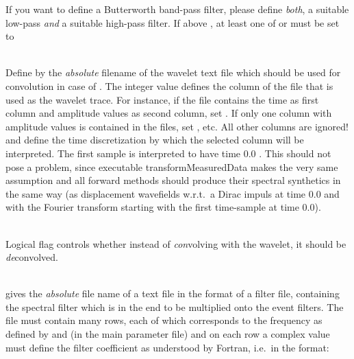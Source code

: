If you want to define a Butterworth band-pass filter, please define \emph{both}, a suitable low-pass \emph{and} 
a suitable high-pass filter. If above  , at least 
one of  or  must be set to  

\textbf{}\\
Define by  the \emph{absolute} filename of the wavelet text file which should be 
used for convolution in case of  . 
The integer value  defines the column of the file that is used as the 
wavelet trace. For instance, if the file contains the time as first column and amplitude values as second column, set
 . If only one column with amplitude values is contained in the files, set 
, etc. All other columns are ignored!
 and  define the time discretization by which the selected column will be interpreted.
The first sample is interpreted to have time $0.0$ . This should not pose a problem, since executable
transformMeasuredData makes the very same assumption and all forward methods should produce their 
spectral synthetics in the same way (as displacement wavefields w.r.t.\ a Dirac impuls at time 0.0
and with the Fourier transform starting with the first time-sample at time 0.0).

\textbf{}\\
Logical flag  controls whether instead of \emph{con}volving with the wavelet, 
it should be \emph{de}convolved.

\textbf{}\\
 gives the \emph{absolute} file name of a text file in the format of a filter file, 
containing the spectral filter which is in the end to be multiplied onto the event filters. 
The file must contain  many rows, 
each of which corresponds to the frequency as defined by  and 
 (in the \ASKI{} main parameter file) and on each row a complex 
value must define the filter coefficient as understood by Fortran, i.e.\ in the format:\\

